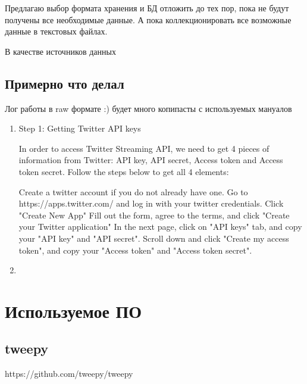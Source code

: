 \documentclass[14pt,a4paper,oneside]{extarticle}
\begin{document}
    Предлагаю выбор формата хранения и БД отложить до тех пор, пока не будут получены все необходимые данные. А пока коллекционировать все возможные данные в текстовых файлах.

    В качестве источников данных 

    \subsection{Примерно что делал}
        Лог работы в raw формате :) будет много копипасты с используемых мануалов
 \begin{enumerate}
    \item Step 1: Getting Twitter API keys

        In order to access Twitter Streaming API, we need to get 4 pieces of information from Twitter: API key, API secret, Access token and Access token secret. Follow the steps below to get all 4 elements:

        Create a twitter account if you do not already have one.
        Go to https://apps.twitter.com/ and log in with your twitter credentials.
        Click "Create New App"
        Fill out the form, agree to the terms, and click "Create your Twitter application"
        In the next page, click on "API keys" tab, and copy your "API key" and "API secret".
        Scroll down and click "Create my access token", and copy your "Access token" and "Access token secret".
    \item 
    \end{enumerate}

\section{Используемое ПО}
    \subsection{tweepy}
        https://github.com/tweepy/tweepy
\end{document}
